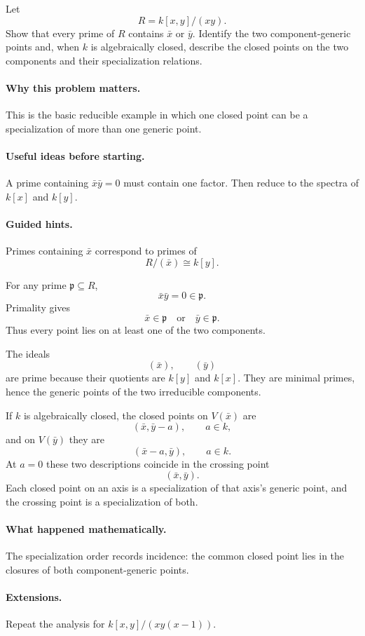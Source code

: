 \begin{problem}
Let
\[
R=k[x,y]/(xy).
\]
Show that every prime of $R$ contains $\bar x$ or $\bar y$.  Identify the two
component-generic points and, when $k$ is algebraically closed, describe the closed points
on the two components and their specialization relations.
\end{problem}

\paragraph{Why this problem matters.}
This is the basic reducible example in which one closed point can be a specialization of
more than one generic point.

\paragraph{Useful ideas before starting.}
A prime containing $\bar x\bar y=0$ must contain one factor.  Then reduce to the spectra of
$k[x]$ and $k[y]$.

\paragraph{Guided hints.}
Primes containing $\bar x$ correspond to primes of
\[
R/(\bar x)\cong k[y].
\]

\begin{solution}
For any prime $\mathfrak p\subseteq R$,
\[
\bar x\bar y=0\in\mathfrak p.
\]
Primality gives
\[
\bar x\in\mathfrak p
\quad\text{or}\quad
\bar y\in\mathfrak p.
\]
Thus every point lies on at least one of the two components.

The ideals
\[
(\bar x),\qquad(\bar y)
\]
are prime because their quotients are $k[y]$ and $k[x]$.  They are minimal primes, hence
the generic points of the two irreducible components.

If $k$ is algebraically closed, the closed points on $V(\bar x)$ are
\[
(\bar x,\bar y-a),\qquad a\in k,
\]
and on $V(\bar y)$ they are
\[
(\bar x-a,\bar y),\qquad a\in k.
\]
At $a=0$ these two descriptions coincide in the crossing point
\[
(\bar x,\bar y).
\]
Each closed point on an axis is a specialization of that axis's generic point, and the
crossing point is a specialization of both.
\end{solution}

\paragraph{What happened mathematically.}
The specialization order records incidence: the common closed point lies in the closures
of both component-generic points.

\paragraph{Extensions.}
Repeat the analysis for $k[x,y]/(xy(x-1))$.
